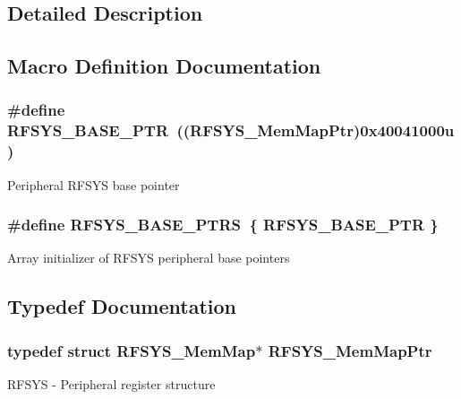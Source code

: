 \subsection{Detailed Description}


\subsection{Macro Definition Documentation}
\hypertarget{group___r_f_s_y_s___peripheral_ga2dab66eae1abcaf22879dbce661ea2fa}{}
\subsubsection[{R\+F\+S\+Y\+S\+\_\+\+B\+A\+S\+E\+\_\+\+P\+T\+R}]{\setlength{\rightskip}{0pt plus 5cm}\#define R\+F\+S\+Y\+S\+\_\+\+B\+A\+S\+E\+\_\+\+P\+T\+R~(({\bf R\+F\+S\+Y\+S\+\_\+\+Mem\+Map\+Ptr})0x40041000u)}\label{group___r_f_s_y_s___peripheral_ga2dab66eae1abcaf22879dbce661ea2fa}
Peripheral R\+F\+S\+Y\+S base pointer \hypertarget{group___r_f_s_y_s___peripheral_ga59f6caa8732744ac3a9f91828ec2daa1}{}
\subsubsection[{R\+F\+S\+Y\+S\+\_\+\+B\+A\+S\+E\+\_\+\+P\+T\+R\+S}]{\setlength{\rightskip}{0pt plus 5cm}\#define R\+F\+S\+Y\+S\+\_\+\+B\+A\+S\+E\+\_\+\+P\+T\+R\+S~\{ {\bf R\+F\+S\+Y\+S\+\_\+\+B\+A\+S\+E\+\_\+\+P\+T\+R} \}}\label{group___r_f_s_y_s___peripheral_ga59f6caa8732744ac3a9f91828ec2daa1}
Array initializer of R\+F\+S\+Y\+S peripheral base pointers 

\subsection{Typedef Documentation}
\hypertarget{group___r_f_s_y_s___peripheral_gaea9e2f6aeeb4976615e3c3dd87acff9e}{}
\subsubsection[{R\+F\+S\+Y\+S\+\_\+\+Mem\+Map\+Ptr}]{\setlength{\rightskip}{0pt plus 5cm}typedef struct {\bf R\+F\+S\+Y\+S\+\_\+\+Mem\+Map}$\ast$ {\bf R\+F\+S\+Y\+S\+\_\+\+Mem\+Map\+Ptr}}\label{group___r_f_s_y_s___peripheral_gaea9e2f6aeeb4976615e3c3dd87acff9e}
R\+F\+S\+Y\+S -\/ Peripheral register structure 